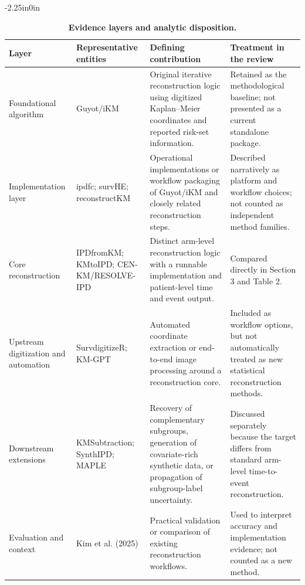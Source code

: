 \documentclass[10pt,letterpaper]{article}
\begin{document}
\begin{table}[!ht]
\begin{adjustwidth}{-2.25in}{0in}
\centering
\caption{\textbf{Evidence layers and analytic disposition.}}
\label{tab:evidence}
\begin{nolinenumbers}
\begingroup
{}
\setlength{\tabcolsep}{3pt}
\renewcommand{\arraystretch}{1.25}
\footnotesize
\begin{tabular}{|>{\raggedright\arraybackslash}p{1.10in}|>{\raggedright\arraybackslash}p{1.48in}|>{\raggedright\arraybackslash}p{2.15in}|>{\raggedright\arraybackslash}p{2.05in}|}
\hline
\rowcolor{gray!18} \textbf{Layer} & \textbf{Representative entities} & \textbf{Defining contribution} & \textbf{Treatment in the review} \\ \hline
Foundational algorithm & Guyot/iKM & Original iterative reconstruction logic using digitized Kaplan--Meier coordinates and reported risk-set information. & Retained as the methodological baseline; not presented as a current standalone package. \\ \hline
Implementation layer & ipdfc; survHE; reconstructKM & Operational implementations or workflow packaging of Guyot/iKM and closely related reconstruction steps. & Described narratively as platform and workflow choices; not counted as independent method families. \\ \hline
Core reconstruction & IPDfromKM; KMtoIPD; CEN-KM/RESOLVE-IPD & Distinct arm-level reconstruction logic with a runnable implementation and patient-level time and event output. & Compared directly in Section 3 and Table 2. \\ \hline
Upstream digitization and automation & SurvdigitizeR; KM-GPT & Automated coordinate extraction or end-to-end image processing around a reconstruction core. & Included as workflow options, but not automatically treated as new statistical reconstruction methods. \\ \hline
Downstream extensions & KMSubtraction; SynthIPD; MAPLE & Recovery of complementary subgroups, generation of covariate-rich synthetic data, or propagation of subgroup-label uncertainty. & Discussed separately because the target differs from standard arm-level time-to-event reconstruction. \\ \hline
Evaluation and context & Kim et al. (2025) & Practical validation or comparison of existing reconstruction workflows. & Used to interpret accuracy and implementation evidence; not counted as a new method. \\ \hline
\end{tabular}
\endgroup
\end{nolinenumbers}
\end{adjustwidth}
\end{table}
\end{document}

